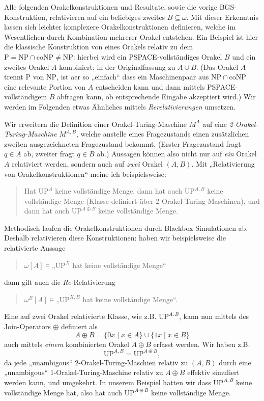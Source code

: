 \documentclass[nofonts]{uebung}
\theoremstyle{definition}
\def\P{\ensuremath{\mathrm{P}}}
\def\NP{\ensuremath{\mathrm{NP}}}
\def\UP{\ensuremath{\mathrm{UP}}}
\def\coNP{\ensuremath{\mathrm{coNP}}}
\begin{document}
Alle folgenden Orakelkonstruktionen und Resultate, sowie die vorige BGS-Konstruktion, relativieren auf ein beliebiges zweites $B\subseteq\omega$.
Mit dieser Erkenntnis lassen sich leichter komplexere Orakelkonstruktionen definieren, welche im Wesentlichen durch Kombination mehrerer Orakel entstehen. Ein Beispiel ist hier die klassische Konstruktion von \citeauthor{baker_relativizations_1975} eines Orakels relativ zu dem $\P=\NP\cap\coNP\neq\NP$: hierbei wird ein PSPACE-vollständiges Orakel $B$ und ein zweites Orakel $A$ kombiniert; in der Originalfassung zu $A\cup B$. (Das Orakel $A$ trennt $\P$ von $\NP$, ist aer so „einfach“ dass ein Maschinenpaar aus $\NP\cap\coNP$ eine relevante Portion von $A$ entscheiden kann und dann mittels PSPACE-vollständigem $B$ abfragen kann, ob entsprechende Eingabe akzeptiert wird.) Wir werden im Folgenden etwas Ähnliches mittels \emph{Rerelativierungen} umsetzen.

Wir erweitern die Definition einer Orakel-Turing-Maschine $M^A$ auf eine \emph{2-Orakel-Turing-Maschine} $M^{A,B}$, welche anstelle eines Fragezustands einen zusätzlichen zweiten ausgezeichneten Fragezustand bekommt. (Erster Fragezustand fragt $q\in A$ ab, zweiter fragt $q\in B$ ab.)
Aussagen können also nicht nur auf \emph{ein} Orakel $A$ relativiert werden, sondern auch auf \emph{zwei} Orakel $(A,B)$.
Mit „Relativierung von Orakelkonstruktionen“ meine ich beispielsweise: 
\begin{quote}
    Hat $\UP^A$ keine vollständige Menge, dann hat auch $\UP^{A,B}$ keine vollständige Menge (Klasse definiert über 2-Orakel-Turing-Maschinen), und dann hat auch $\UP^{A\oplus B}$ keine vollständige Menge.
\end{quote}

Methodisch laufen die Orakelkonstruktionen durch Blackbox-Simulationen ab. Deshalb relativieren diese Konstruktionen:
haben wir beispielsweise die relativierte Aussage \begin{quote}$\omega[A]\vDash „\UP^X$ hat keine vollständige Menge“\end{quote}  dann gilt auch die \emph{Re-}Relativierung \begin{quote}$\omega^B[A]\vDash „\UP^{X,B}$ hat keine vollständige Menge“.\end{quote}
Eine auf zwei Orakel relativierte Klasse, wie z.B. $\UP^{A,B}$, kann nun mittels des Join-Operators $\oplus$ definiert als
\[ A\oplus B = \{0x\mid x\in A\}\cup\{1x\mid x\in B\} \] 
auch mittels \emph{einem} kombinierten Orakel $A\oplus B$ erfasst werden. Wir haben z.B.
\[ \UP^{A,B} = \UP^{A\oplus B}, \]
da jede „unambigous“ 2-Orakel-Turing-Maschien relativ zu $(A,B)$ durch eine „unambigous“ 1-Orakel-Turing-Maschine relativ zu $A\oplus B$ effektiv simuliert werden kann, und umgekehrt.
In unserem Beispiel hatten wir dass $\UP^{A,B}$ keine vollständige Menge hat, also hat auch $\UP^{A\oplus B}$ keine vollständige Menge.
\end{document}
